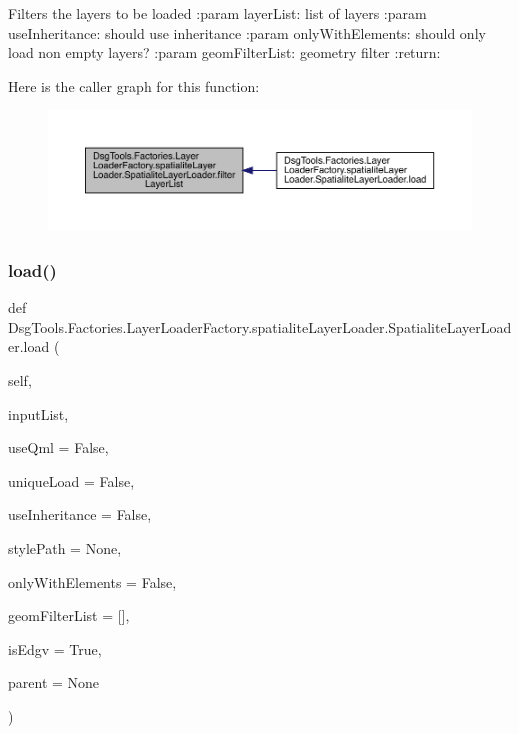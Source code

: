 \begin{DoxyVerb}Filters the layers to be loaded
:param layerList: list of layers
:param useInheritance: should use inheritance
:param onlyWithElements: should only load non empty layers?
:param geomFilterList: geometry filter
:return:
\end{DoxyVerb}
 Here is the caller graph for this function\+:
\nopagebreak
\begin{figure}[H]
\begin{center}
\leavevmode
\includegraphics[width=350pt]{class_dsg_tools_1_1_factories_1_1_layer_loader_factory_1_1spatialite_layer_loader_1_1_spatialite_layer_loader_aad3c3df9e70822f96bef5e08491c762c_icgraph}
\end{center}
\end{figure}
\mbox{\label{class_dsg_tools_1_1_factories_1_1_layer_loader_factory_1_1spatialite_layer_loader_1_1_spatialite_layer_loader_a17fcbc72caf568e12a88b1b4c1449038}} 
\subsubsection{\texorpdfstring{load()}{load()}}
{\footnotesize\ttfamily def Dsg\+Tools.\+Factories.\+Layer\+Loader\+Factory.\+spatialite\+Layer\+Loader.\+Spatialite\+Layer\+Loader.\+load (\begin{DoxyParamCaption}\item[{}]{self,  }\item[{}]{input\+List,  }\item[{}]{use\+Qml = {\ttfamily False},  }\item[{}]{unique\+Load = {\ttfamily False},  }\item[{}]{use\+Inheritance = {\ttfamily False},  }\item[{}]{style\+Path = {\ttfamily None},  }\item[{}]{only\+With\+Elements = {\ttfamily False},  }\item[{}]{geom\+Filter\+List = {\ttfamily \mbox{[}\mbox{]}},  }\item[{}]{is\+Edgv = {\ttfamily True},  }\item[{}]{parent = {\ttfamily None} }\end{DoxyParamCaption})}

